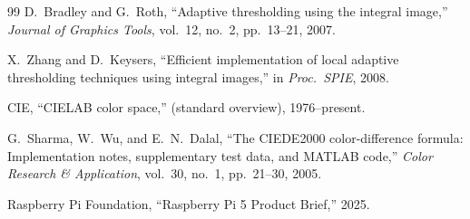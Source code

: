 \documentclass[twocolumn, 10pt]{article}
\begin{document}
\begin{thebibliography}{99}
D.~Bradley and G.~Roth, ``Adaptive thresholding using the integral image,'' \emph{Journal of Graphics Tools}, vol.~12, no.~2, pp.~13--21, 2007.

X.~Zhang and D.~Keysers, ``Efficient implementation of local adaptive thresholding techniques using integral images,'' in \emph{Proc.\ SPIE}, 2008.

CIE, ``CIELAB color space,'' (standard overview), 1976--present.

G.~Sharma, W.~Wu, and E.~N.~Dalal, ``The CIEDE2000 color-difference formula: Implementation notes, supplementary test data, and MATLAB code,'' \emph{Color Research \& Application}, vol.~30, no.~1, pp.~21--30, 2005.

Raspberry Pi Foundation, ``Raspberry Pi 5 Product Brief,'' 2025.

\end{thebibliography}
\end{document}
